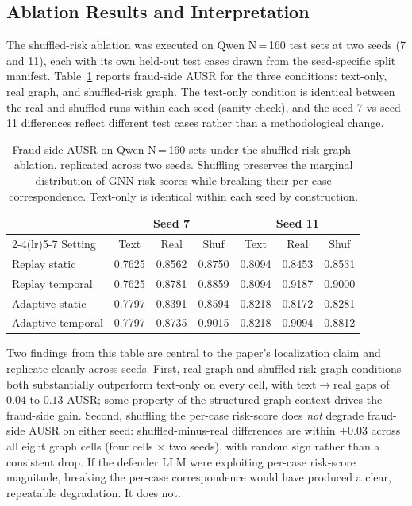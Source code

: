 \documentclass[10pt,letterpaper]{article}
\begin{document}
\subsection{Ablation Results and Interpretation}
\label{sec:localize-results}
The shuffled-risk ablation was executed on Qwen N\,=\,160 test sets at two seeds (7 and 11), each with its own held-out test cases drawn from the seed-specific split manifest. Table~\ref{tab:shuffle-ablation} reports fraud-side AUSR for the three conditions: text-only, real graph, and shuffled-risk graph. The text-only condition is identical between the real and shuffled runs within each seed (sanity check), and the seed-7 vs seed-11 differences reflect different test cases rather than a methodological change.

\begin{table}[H]
\centering
\small
\begin{tabular}{lcccccc}
\toprule
& \multicolumn{3}{c}{Seed 7} & \multicolumn{3}{c}{Seed 11} \\
\cmidrule(lr){2-4}\cmidrule(lr){5-7}
Setting & Text & Real & Shuf & Text & Real & Shuf \\
\midrule
Replay static & 0.7625 & 0.8562 & 0.8750 & 0.8094 & 0.8453 & 0.8531 \\
Replay temporal & 0.7625 & 0.8781 & 0.8859 & 0.8094 & 0.9187 & 0.9000 \\
Adaptive static & 0.7797 & 0.8391 & 0.8594 & 0.8218 & 0.8172 & 0.8281 \\
Adaptive temporal & 0.7797 & 0.8735 & 0.9015 & 0.8218 & 0.9094 & 0.8812 \\
\bottomrule
\end{tabular}
\caption{Fraud-side AUSR on Qwen N\,=\,160 sets under the shuffled-risk graph-ablation, replicated across two seeds. Shuffling preserves the marginal distribution of GNN risk-scores while breaking their per-case correspondence. Text-only is identical within each seed by construction.}
\label{tab:shuffle-ablation}
\end{table}

Two findings from this table are central to the paper's localization claim and replicate cleanly across seeds. First, real-graph and shuffled-risk graph conditions both substantially outperform text-only on every cell, with text$\to$real gaps of $0.04$ to $0.13$ AUSR; some property of the structured graph context drives the fraud-side gain. Second, shuffling the per-case risk-score does \emph{not} degrade fraud-side AUSR on either seed: shuffled-minus-real differences are within $\pm 0.03$ across all eight graph cells (four cells $\times$ two seeds), with random sign rather than a consistent drop. If the defender LLM were exploiting per-case risk-score magnitude, breaking the per-case correspondence would have produced a clear, repeatable degradation. It does not.
\end{document}
